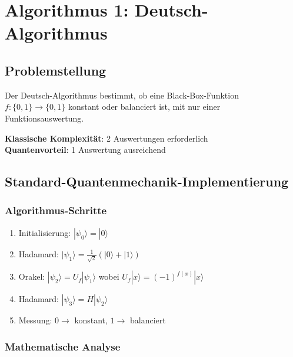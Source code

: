 \documentclass[12pt,a4paper]{article}
\begin{document}
	\section{Algorithmus 1: Deutsch-Algorithmus}
	
	\subsection{Problemstellung}
	
	Der Deutsch-Algorithmus bestimmt, ob eine Black-Box-Funktion $f: \{0,1\} \rightarrow \{0,1\}$ konstant oder balanciert ist, mit nur einer Funktionsauswertung.
	
	\textbf{Klassische Komplexität}: 2 Auswertungen erforderlich \\
	\textbf{Quantenvorteil}: 1 Auswertung ausreichend
	
	\subsection{Standard-Quantenmechanik-Implementierung}
	
	\subsubsection{Algorithmus-Schritte}
	\begin{enumerate}
		\item Initialisierung: $|\psi_0\rangle = |0\rangle$
		\item Hadamard: $|\psi_1\rangle = \frac{1}{\sqrt{2}}(|0\rangle + |1\rangle)$
		\item Orakel: $|\psi_2\rangle = U_f|\psi_1\rangle$ wobei $U_f|x\rangle = (-1)^{f(x)}|x\rangle$
		\item Hadamard: $|\psi_3\rangle = H|\psi_2\rangle$
		\item Messung: $0 \rightarrow$ konstant, $1 \rightarrow$ balanciert
	\end{enumerate}
	
	\subsubsection{Mathematische Analyse}
	
\end{document}
